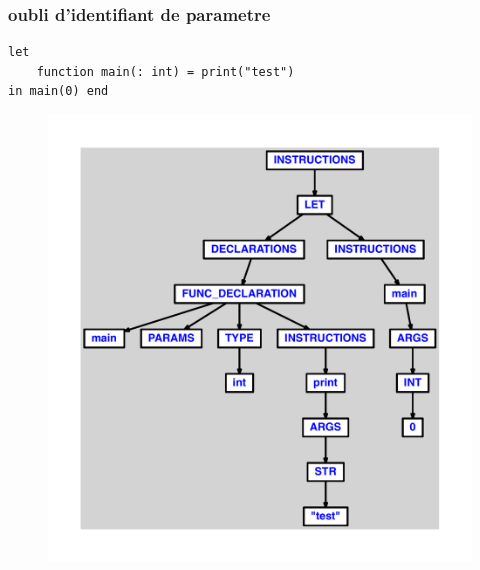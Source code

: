 \documentclass{article}
\begin{document}
\subsubsection{oubli d'identifiant de parametre}
\begin{lstlisting}
let
	function main(: int) = print("test")
in main(0) end
\end{lstlisting}
\newpage
\begin{figure}[H]
\centering
\includegraphics[max width=\textwidth]{ast/ast_217.pdf}
\end{figure}
\newpage
\end{document}

